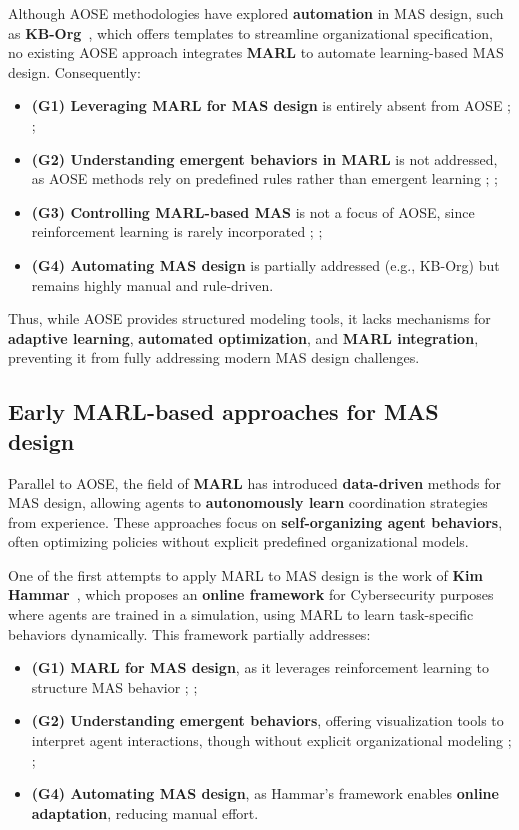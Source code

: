 \documentclass[pdflatex,sn-mathphys-num]{sn-jnl}%
\theoremstyle{thmstyleone}%
\theoremstyle{thmstyletwo}%
\theoremstyle{thmstylethree}%
\begin{document}
Although AOSE methodologies have explored \textbf{automation} in MAS design, such as \textbf{KB-Org}~\cite{kborg2001}, which offers templates to streamline organizational specification, no existing AOSE approach integrates \textbf{MARL} to automate learning-based MAS design. Consequently:
%
\begin{itemize}
    \item \textbf{(G1) Leveraging MARL for MAS design} is entirely absent from AOSE ; ;
    \item \textbf{(G2) Understanding emergent behaviors in MARL} is not addressed, as AOSE methods rely on predefined rules rather than emergent learning ; ;
    \item \textbf{(G3) Controlling MARL-based MAS} is not a focus of AOSE, since reinforcement learning is rarely incorporated ; ;
    \item \textbf{(G4) Automating MAS design} is partially addressed (e.g., KB-Org) but remains highly manual and rule-driven.
\end{itemize}

Thus, while AOSE provides structured modeling tools, it lacks mechanisms for \textbf{adaptive learning}, \textbf{automated optimization}, and \textbf{MARL integration}, preventing it from fully addressing modern MAS design challenges.

\subsection{Early MARL-based approaches for MAS design}

Parallel to AOSE, the field of \textbf{MARL} has introduced \textbf{data-driven} methods for MAS design, allowing agents to \textbf{autonomously learn} coordination strategies from experience. These approaches focus on \textbf{self-organizing agent behaviors}, often optimizing policies without explicit predefined organizational models.

One of the first attempts to apply MARL to MAS design is the work of \textbf{Kim Hammar}~\cite{hammar2019}, which proposes an \textbf{online framework} for Cybersecurity purposes where agents are trained in a simulation, using MARL to learn task-specific behaviors dynamically. This framework partially addresses:
%
\begin{itemize}
    \item \textbf{(G1) MARL for MAS design}, as it leverages reinforcement learning to structure MAS behavior ; ;
    \item \textbf{(G2) Understanding emergent behaviors}, offering visualization tools to interpret agent interactions, though without explicit organizational modeling ; ;
    \item \textbf{(G4) Automating MAS design}, as Hammar's framework enables \textbf{online adaptation}, reducing manual effort.
\end{itemize}
\end{document}
